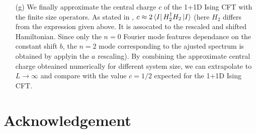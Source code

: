 \documentclass[10pt, a4paper]{article}
\begin{document}
{\begin{enumerate}
  \item[(g)]  We finally approximate the central charge $c$ of the 1+1D Ising CFT with the finite size operators. As stated in \cite{spinchain}, $c \approx 2 \bra{I}H_2^{\dagger} H_2 \ket{I}$ (here $H_2$ differs from the expression given above. It is assocated to the rescaled and shifted Hamiltonian. Since only the $n=0$ Fourier mode features dependance on the constant shift $b$, the $n=2$ mode corresponding to the ajusted spectrum is obtained by applyin the $a$ rescaling). By combining the approximate central charge obteained numerically for different system size, we can extrapolate to $L\to \infty$ and compare with the value $c = 1/2$ expected for the 1+1D Ising CFT. 
\end{enumerate}


\section{Acknowledgement}

}

\makereferences


\end{document}
